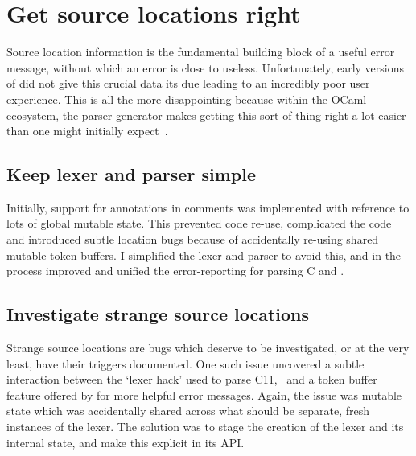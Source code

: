 \section{Get source locations right}

Source location information is the fundamental building block of a useful error
message, without which an error is close to useless. Unfortunately, early
versions of  did not give this crucial data its due leading to an
incredibly poor user experience. This is all the more disappointing because
within the OCaml ecosystem, the  parser generator makes getting this
sort of thing right a lot easier than one might initially
expect~.

\subsection{Keep lexer and parser simple}

Initially, support for 
annotations in comments was implemented with reference to lots of global
mutable state.
This prevented code re-use, complicated the code and introduced subtle
location bugs because of accidentally re-using shared mutable token
buffers. I simplified the lexer and parser to avoid this, and in the
process improved and unified the error-reporting for parsing C and
.

\subsection{Investigate strange source locations}

Strange source locations are
bugs which deserve to be investigated, or at the very least, have their
triggers documented. One such
issue uncovered a subtle interaction between the `lexer hack' used to parse
C11,~ and a token buffer feature offered by
 for more helpful error messages. Again, the issue was mutable state
which was accidentally shared across what should be separate, fresh instances
of the lexer. The solution was to stage the creation of the lexer and its
internal state, and make this explicit in its
API.

